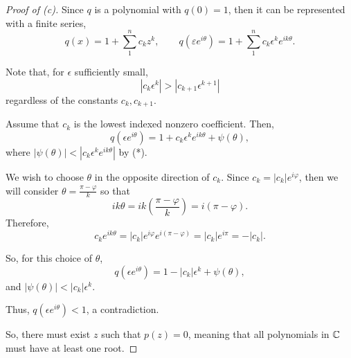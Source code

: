\documentclass[../hw1]{subfiles}
\begin{document}
\begin{proof}[Proof of (c)]
	Since $q$ is a polynomial with  $q(0)=1$, then it can be represented with a finite series,  \[
		q(x)=1+\sum_{1}^{n} c_k z^k, \qquad q(\varepsilon e^{i\theta}) = 1 + \sum_{1}^{n} c_k \epsilon^k e^{i k \theta}
		.\]

	Note that, for $\epsilon$ sufficiently small, \[
		|c_k \epsilon^k | > |c_{k+1} \epsilon^{k+1}| \tag{*}
	\] regardless of the constants $c_k,c_{k+1}$.

	Assume that $c_k$ is the lowest indexed nonzero coefficient.
	Then, \[
		q(\epsilon e^{i\theta}) = 1 + c_k \epsilon^k e^{i k \theta} + \psi(\theta)
		,\] where $|\psi(\theta)| < | c_k \epsilon^k e^{i k \theta}|$ by (*).

	We wish to choose $\theta$ in the opposite direction of  $c_k$.
	Since $c_k=|c_k|e^{i\varphi}$, then we will consider $\theta=\frac{\pi-\varphi}{k}$ so that \[
		{i k \theta} = {i k \left( \frac{\pi-\varphi}{k} \right) } = {i(\pi-\varphi)}
		.\]
	Therefore, \[
		c_k e^{i k \theta} = |c_k|e^{i\varphi}e^{i(\pi-\varphi)}=|c_k|e^{i\pi}=-|c_k|
		.\]

	So, for this choice of $\theta$,  \[
		q(\epsilon e^{i \theta}) = 1 - |c_k| \epsilon^k + \psi(\theta)
		,\] and $|\psi(\theta)| < |c_k|\epsilon^k$.

	Thus, $q(\epsilon e^{i\theta})<1$, a contradiction.

	So, there must exist $z$ such that  $p(z)=0$, meaning that all polynomials in  $\mathbb{C}$ must have at least one root.
\end{proof}
\end{document}
